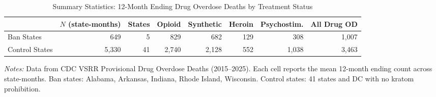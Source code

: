 \begin{table}[!ht]
\centering
\caption{Summary Statistics: 12-Month Ending Drug Overdose Deaths by Treatment Status}
\label{tab:sumstats}
\footnotesize
\begin{threeparttable}
\begin{tabular}{lrrrrrrr}
\toprule
 & $N$ (state-months) & States & Opioid & Synthetic & Heroin & Psychostim. & All Drug OD \\
\midrule
Ban States & 649 & 5 & 829 & 682 & 129 & 308 & 1,007 \\
Control States & 5,330 & 41 & 2,740 & 2,128 & 552 & 1,038 & 3,463 \\
\bottomrule
\end{tabular}
\begin{tablenotes}[flushleft]\small
\item \textit{Notes:} Data from CDC VSRR Provisional Drug Overdose Deaths (2015--2025). Each cell reports the mean 12-month ending count across state-months. Ban states: Alabama, Arkansas, Indiana, Rhode Island, Wisconsin. Control states: 41 states and DC with no kratom prohibition.
\end{tablenotes}
\end{threeparttable}
\end{table}
